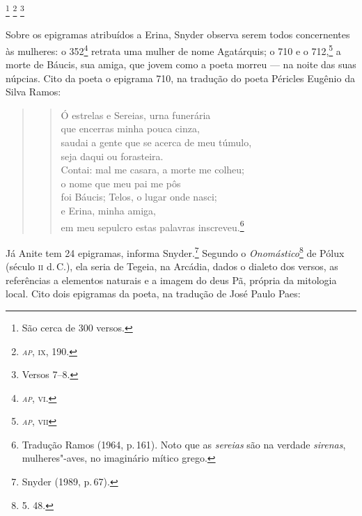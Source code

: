 \footnote{São cerca de 300 versos.} \footnote{\emph{\textsc{ap}}, \textsc{ix}, 190.}
\footnote{Versos 7--8.}

Sobre os epigramas atribuídos a Erina, Snyder observa
serem todos concernentes às mulheres: o 352\footnote{\emph{\textsc{ap}}, \textsc{vi}.}
retrata uma mulher de nome Agatárquis; o 710 e o 712,\footnote{\emph{\textsc{ap}}, \textsc{vii}} a morte de 
Báucis, sua amiga, que jovem como a poeta morreu --- na noite das suas núpcias.
Cito da poeta o epigrama 710, na tradução do poeta Péricles Eugênio da Silva Ramos:

\begin{quote}
\begin{verse}
Ó estrelas e Sereias, urna funerária\\ 
\quad que encerras minha pouca cinza,\\
saudai a gente que se acerca de meu túmulo,\\
\quad seja daqui ou forasteira.\\
Contai: mal me casara, a morte me colheu;\\
\quad o nome que meu pai me pôs\\
foi Báucis; Telos, o lugar onde nasci;\\
\quad e Erina, minha amiga,\\
em meu sepulcro estas palavras inscreveu.\footnote{Tradução Ramos (1964, p.\,161). Noto que as \emph{sereias} são na verdade \emph{sirenas}, mulheres"-aves, no imaginário mítico grego.}
\end{verse}
\end{quote}

Já Anite tem 24 
epigramas, informa Snyder.\footnote{ Snyder (1989, p.\,67).} Segundo o \emph{Onomástico}\footnote{5. 48.} de
Pólux (século \textsc{ii} d.\,C.), ela seria de Tegeia, na Arcádia, dados o dialeto dos
versos, as referências a elementos naturais e a imagem do deus Pã, própria da
mitologia local. Cito dois epigramas da poeta, na tradução de José Paulo Paes:


